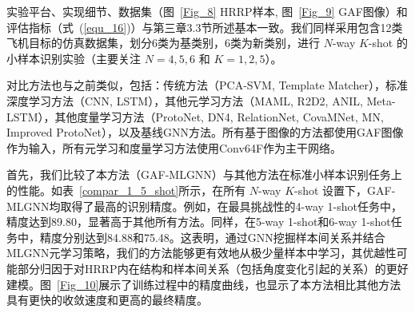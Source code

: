 实验平台、实现细节、数据集（图~\ref{Fig_8} HRRP样本, 图~\ref{Fig_9} GAF图像）和评估指标（式~(\ref{equ_16})）与第三章3.3节所述基本一致。我们同样采用包含12类飞机目标的仿真数据集，划分6类为基类别，6类为新类别，进行 $N$-way $K$-shot 的小样本识别实验（主要关注 $N=4, 5, 6$ 和 $K=1, 2, 5$）。

对比方法也与之前类似，包括：传统方法（PCA-SVM, Template Matcher），标准深度学习方法（CNN, LSTM），其他元学习方法（MAML, R2D2, ANIL, Meta-LSTM），其他度量学习方法（ProtoNet, DN4, RelationNet, CovaMNet, MN, Improved ProtoNet），以及基线GNN方法。所有基于图像的方法都使用GAF图像作为输入，所有元学习和度量学习方法使用Conv64F作为主干网络。

首先，我们比较了本方法（GAF-MLGNN）与其他方法在标准小样本识别任务上的性能。如表~\ref{compar_1_5_shot}所示，在所有 $N$-way $K$-shot 设置下，GAF-MLGNN均取得了最高的识别精度。例如，在最具挑战性的4-way 1-shot任务中，精度达到89.80，显著高于其他所有方法。同样，在5-way 1-shot和6-way 1-shot任务中，精度分别达到84.88和75.48。这表明，通过GNN挖掘样本间关系并结合MLGNN元学习策略，我们的方法能够更有效地从极少量样本中学习，其优越性可能部分归因于对HRRP内在结构和样本间关系（包括角度变化引起的关系）的更好建模。图~\ref{Fig_10}展示了训练过程中的精度曲线，也显示了本方法相比其他方法具有更快的收敛速度和更高的最终精度。

